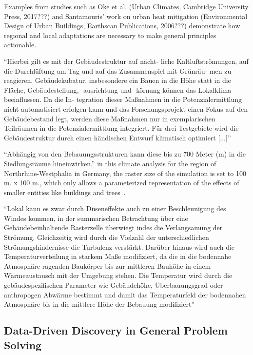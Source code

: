 \documentclass[times,final]{elsarticle}
\begin{document}
Examples from studies such as Oke et al. (Urban Climates, Cambridge University Press, 2017???) and Santamouris' work on urban heat mitigation (Environmental Design of Urban Buildings, Earthscan Publications, 2006???) demonstrate how regional and local adaptations are necessary to make general principles actionable.

``Hierbei gilt es mit der Gebäudestruktur auf nächt-
liche Kaltluftströmungen, auf die Durchlüftung am Tag und auf das Zusammenspiel mit Grünräu-
men zu reagieren. Gebäudekubatur, insbesondere ein Bauen in die Höhe statt in die Fläche,
Gebäudestellung, -ausrichtung und -körnung können das Lokalklima beeinflussen. Da die In-
tegration dieser Maßnahmen in die Potenzialermittlung nicht automatisiert erfolgen kann und das
Forschungsprojekt einen Fokus auf den Gebäudebestand legt, werden diese Maßnahmen nur in
exemplarischen Teilräumen in die Potenzialermittlung integriert. Für drei Testgebiete wird die
Gebäudestruktur durch einen händischen Entwurf klimatisch optimiert [...]''~\cite{berchtold2023MUTABOR}

``Abhängig von den Bebauungsstrukturen kann diese bis zu 700 Meter (m) in die Siedlungsräume hineinwirken.'' in this climate analysis for the region of Northrhine-Westphalia in Germany, the raster size of the simulation is set to 100 m. x 100 m., which only allows a parameterized representation of the effects of smaller entities like buildings and trees~\cite{Kruse2018lanuv}.

``Lokal kann es zwar durch Düseneffekte auch zu einer Beschleunigung des Windes kommen, in der
summarischen Betrachtung über eine Gebäudebeinhaltende Rasterzelle überwiegt indes die Verlangsamung der Strömung. Gleichzeitig wird durch die Vielzahl der unterschiedlichen Strömungshindernisse die Turbulenz verstärkt. Darüber hinaus wird auch die Temperaturverteilung in starkem Maße modifiziert, da die in die bodennahe Atmosphäre ragenden Baukörper bis zur mittleren Bauhöhe in einem Wärmeaustausch mit der
Umgebung stehen. Die Temperatur wird durch die gebäudespezifischen Parameter wie Gebäudehöhe, Überbauungsgrad oder anthropogen Abwärme bestimmt und damit das Temperaturfeld der bodennahen Atmosphäre bis in die mittlere Höhe der Bebauung
modifiziert''~\cite{Kruse2018lanuv}



\subsection{Data-Driven Discovery in General Problem Solving}
\end{document}
